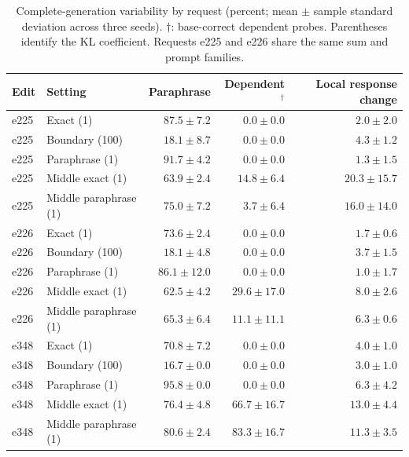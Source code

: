 \begin{table}[t]
\centering\small
\begin{tabular}{llrrr}
\toprule
Edit & Setting & Paraphrase & Dependent$^\dagger$ & Local response change \\
\midrule
e225 & Exact (1) & $87.5 \pm 7.2$ & $0.0 \pm 0.0$ & $2.0 \pm 2.0$ \\
e225 & Boundary (100) & $18.1 \pm 8.7$ & $0.0 \pm 0.0$ & $4.3 \pm 1.2$ \\
e225 & Paraphrase (1) & $91.7 \pm 4.2$ & $0.0 \pm 0.0$ & $1.3 \pm 1.5$ \\
e225 & Middle exact (1) & $63.9 \pm 2.4$ & $14.8 \pm 6.4$ & $20.3 \pm 15.7$ \\
e225 & Middle paraphrase (1) & $75.0 \pm 7.2$ & $3.7 \pm 6.4$ & $16.0 \pm 14.0$ \\
e226 & Exact (1) & $73.6 \pm 2.4$ & $0.0 \pm 0.0$ & $1.7 \pm 0.6$ \\
e226 & Boundary (100) & $18.1 \pm 4.8$ & $0.0 \pm 0.0$ & $3.7 \pm 1.5$ \\
e226 & Paraphrase (1) & $86.1 \pm 12.0$ & $0.0 \pm 0.0$ & $1.0 \pm 1.7$ \\
e226 & Middle exact (1) & $62.5 \pm 4.2$ & $29.6 \pm 17.0$ & $8.0 \pm 2.6$ \\
e226 & Middle paraphrase (1) & $65.3 \pm 6.4$ & $11.1 \pm 11.1$ & $6.3 \pm 0.6$ \\
e348 & Exact (1) & $70.8 \pm 7.2$ & $0.0 \pm 0.0$ & $4.0 \pm 1.0$ \\
e348 & Boundary (100) & $16.7 \pm 0.0$ & $0.0 \pm 0.0$ & $3.0 \pm 1.0$ \\
e348 & Paraphrase (1) & $95.8 \pm 0.0$ & $0.0 \pm 0.0$ & $6.3 \pm 4.2$ \\
e348 & Middle exact (1) & $76.4 \pm 4.8$ & $66.7 \pm 16.7$ & $13.0 \pm 4.4$ \\
e348 & Middle paraphrase (1) & $80.6 \pm 2.4$ & $83.3 \pm 16.7$ & $11.3 \pm 3.5$ \\
\bottomrule
\end{tabular}
\caption{Complete-generation variability by request (percent; mean $\pm$ sample standard deviation across three seeds). $\dagger$: base-correct dependent probes. Parentheses identify the KL coefficient. Requests e225 and e226 share the same sum and prompt families.}
\label{tab:variation}
\end{table}